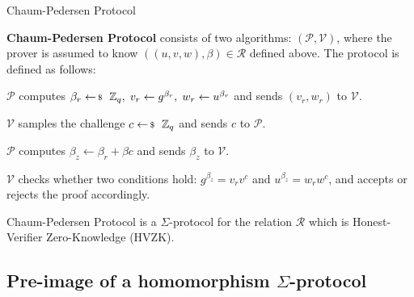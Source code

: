 \documentclass{zkdl-presentation-template}
\begin{document}
    \begin{frame}{Chaum-Pedersen Protocol}
        \begin{definition}
            \textbf{Chaum-Pedersen Protocol} consists of two algorithms: $(\mathcal{P}, \mathcal{V})$, where the prover is assumed to know $((u,v,w),\beta) \in \mathcal{R}$ defined above. The protocol is defined as follows:\pause
            \begin{algoen}
                \item $\mathcal{P}$ computes $\beta_r \leftarrowS \mathbb{Z}_q, \; v_r \gets g^{\beta_r}, \; w_r \gets u^{\beta_r}$ and sends $(v_r,w_r)$ to $\mathcal{V}$.\pause
                \item $\mathcal{V}$ samples the challenge $c \leftarrowS \mathbb{Z}_q$ and sends $c$ to $\mathcal{P}$.\pause
                \item $\mathcal{P}$ computes $\beta_z \gets \beta_r + \beta c$ and sends $\beta_z$ to $\mathcal{V}$.\pause
                \item $\mathcal{V}$ checks whether two conditions hold: $g^{\beta_z} = v_rv^c$ and $u^{\beta_z} = w_r w^c$, and accepts or rejects the proof accordingly.\pause
            \end{algoen}
        \end{definition}

        \begin{theorem}
            Chaum-Pedersen Protocol is a $\Sigma$-protocol for the relation $\mathcal{R}$ which is Honest-Verifier Zero-Knowledge (HVZK).
        \end{theorem}
    \end{frame}

    \subsection{Pre-image of a homomorphism $\Sigma$-protocol}
\end{document}
